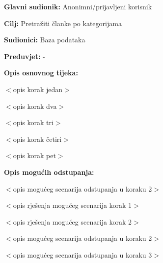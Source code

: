 \noindent {}
\begin{packed_item}

\item \textbf{Glavni sudionik:} Anonimni/prijavljeni korisnik
\item  \textbf{Cilj:} Pretražiti članke po kategorijama
\item  \textbf{Sudionici:} Baza podataka
\item  \textbf{Preduvjet:} -
\item  \textbf{Opis osnovnog tijeka:}

\item[] \begin{packed_enum}

    \item $<$opis korak jedan$>$
    \item $<$opis korak dva$>$
    \item $<$opis korak tri$>$
    \item $<$opis korak četiri$>$
    \item $<$opis korak pet$>$

\end{packed_enum}

\item  \textbf{Opis mogućih odstupanja:}

\item[] \begin{packed_item}

    \item[2.a] $<$opis mogućeg scenarija odstupanja u koraku 2$>$

    \item[] \begin{packed_enum}

        \item $<$opis rješenja mogućeg scenarija korak 1$>$
        \item $<$opis rješenja mogućeg scenarija korak 2$>$

    \end{packed_enum}

\item[2.b] $<$opis mogućeg scenarija odstupanja u koraku 2$>$
\item[3.a] $<$opis mogućeg scenarija odstupanja  u koraku 3$>$

\end{packed_item}

\end{packed_item}

